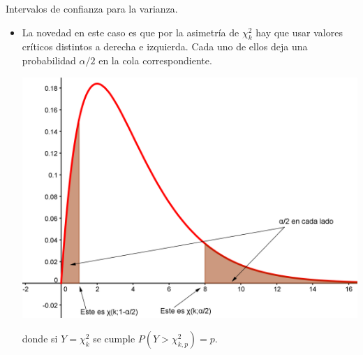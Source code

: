 \documentclass[
  9pt,
  ignorenonframetext,
]{beamer}
\begin{document}
\begin{frame}{Intervalos de confianza para la varianza.}
\protect\hypertarget{intervalos-de-confianza-para-la-varianza.-1}{}

\begin{itemize}
\item
  La novedad en este caso es que por la asimetría de \(\chi^2_k\) hay
  que usar valores críticos distintos a derecha e izquierda. Cada uno de
  ellos deja una probabilidad \(\alpha/2\) en la cola correspondiente.

  \begin{center}\includegraphics[width=0.45\linewidth]{../fig/06-07-ChiCuadradoValoresCriticosIntervalo} \end{center}

  donde si \(Y = \chi^2_k\) se cumple \(P(Y > \chi^2_{k, p}) = p\).

  \begin{center}
  \end{center}
\end{itemize}

\end{frame}
\end{document}
